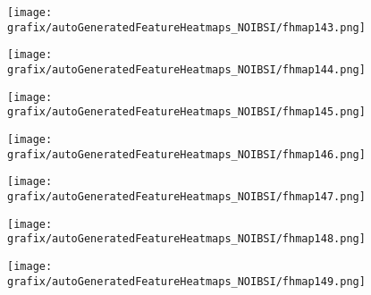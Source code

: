 \begin{subfigure}{\wid\textwidth} 
    \centering 
    \caption{\tiny \sffamily {}} 
    \vspace{\vsp} 
    \texttt{[image: grafix/autoGeneratedFeatureHeatmaps\_NOIBSI/fhmap143.png]} 
\end{subfigure} 
\hspace{\hsp} 
\begin{subfigure}{\wid\textwidth} 
    \centering 
    \caption{\tiny \sffamily {}} 
    \vspace{\vsp} 
    \texttt{[image: grafix/autoGeneratedFeatureHeatmaps\_NOIBSI/fhmap144.png]} 
\end{subfigure} 
\hspace{\hsp} 
\begin{subfigure}{\wid\textwidth} 
    \centering 
    \caption{\tiny \sffamily {}} 
    \vspace{\vsp} 
    \texttt{[image: grafix/autoGeneratedFeatureHeatmaps\_NOIBSI/fhmap145.png]} 
\end{subfigure} 
\hspace{\hsp} 
\begin{subfigure}{\wid\textwidth} 
    \centering 
    \caption{\tiny \sffamily {}} 
    \vspace{\vsp} 
    \texttt{[image: grafix/autoGeneratedFeatureHeatmaps\_NOIBSI/fhmap146.png]} 
\end{subfigure} 
\hspace{\hsp} 
\begin{subfigure}{\wid\textwidth} 
    \centering 
    \caption{\tiny \sffamily {}} 
    \vspace{\vsp} 
    \texttt{[image: grafix/autoGeneratedFeatureHeatmaps\_NOIBSI/fhmap147.png]} 
\end{subfigure} 
\hspace{\hsp} 
\begin{subfigure}{\wid\textwidth} 
    \centering 
    \caption{\tiny \sffamily {}} 
    \vspace{\vsp} 
    \texttt{[image: grafix/autoGeneratedFeatureHeatmaps\_NOIBSI/fhmap148.png]} 
\end{subfigure} 
\hspace{\hsp} 
\begin{subfigure}{\wid\textwidth} 
    \centering 
    \caption{\tiny \sffamily {}} 
    \vspace{\vsp} 
    \texttt{[image: grafix/autoGeneratedFeatureHeatmaps\_NOIBSI/fhmap149.png]} 
\end{subfigure} 

